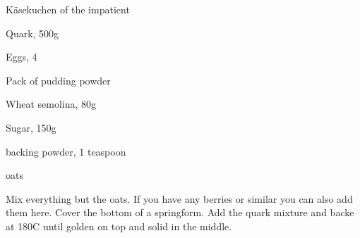 \begin{recipe}{Käsekuchen of the impatient}
    \begin{ingr}[2-3]
    \item Quark, 500g
    \item Eggs, 4
    \item Pack of pudding powder
    \item Wheat semolina, 80g
    \item Sugar, 150g
    \item backing powder, 1 teaspoon
    \item oats
    \end{ingr}
    Mix everything but the oats. If you have any berries
    or similar you can also add them here.
    Cover the bottom of a springform.
    Add the quark mixture and backe at 180C until golden on
    top and solid in the middle.

\end{recipe}
